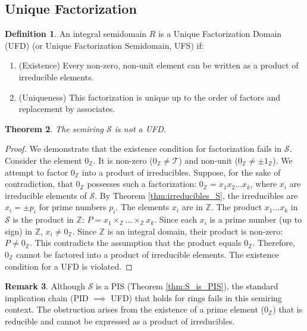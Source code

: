 \documentclass[11pt, a4paper]{article}
\theoremstyle{plain}
\newtheorem{theorem}{Theorem}[section]
\theoremstyle{definition}
\newtheorem{definition}[theorem]{Definition}
\newtheorem{remark}[theorem]{Remark}
\numberwithin{equation}{section}
\newcommand{\Z}{\mathbb{Z}}
\newcommand{\Tobj}{\mathcal{T}} %
\newcommand{\SemiringS}{\mathcal{S}}
\begin{document}
\subsection{Unique Factorization}

\begin{definition}
An integral semidomain $R$ is a Unique Factorization Domain (UFD) (or Unique Factorization Semidomain, UFS) if:
\begin{enumerate}
    \item (Existence) Every non-zero, non-unit element can be written as a product of irreducible elements.
    \item (Uniqueness) This factorization is unique up to the order of factors and replacement by associates.
\end{enumerate}
\end{definition}

\begin{theorem}\label{thm:S_not_UFD}
The semiring $\SemiringS$ is not a UFD.
\end{theorem}
\begin{proof}
We demonstrate that the existence condition for factorization fails in $\SemiringS$.
Consider the element $0_{\Z}$. It is non-zero ($0_{\Z}\neq\Tobj$) and non-unit ($0_{\Z}\neq\pm 1_{\Z}$).
We attempt to factor $0_{\Z}$ into a product of irreducibles. Suppose, for the sake of contradiction, that $0_{\Z}$ possesses such a factorization: $0_{\Z} = x_1 x_2 \dots x_k$, where $x_i$ are irreducible elements of $\SemiringS$.
By Theorem \ref{thm:irreducibles_S}, the irreducibles are $x_i = \pm p_i$ for prime numbers $p_i$.
The elements $x_i$ are in $\Z$. The product $x_1 \dots x_k$ in $\SemiringS$ is the product in $\Z$: $P = x_1\times_{\Z}\dots\times_{\Z} x_k$.
Since each $x_i$ is a prime number (up to sign) in $\Z$, $x_i \neq 0_{\Z}$. Since $\Z$ is an integral domain, their product is non-zero: $P \neq 0_{\Z}$.
This contradicts the assumption that the product equals $0_{\Z}$.
Therefore, $0_{\Z}$ cannot be factored into a product of irreducible elements. The existence condition for a UFD is violated.
\end{proof}

\begin{remark}
Although $\SemiringS$ is a PIS (Theorem \ref{thm:S_is_PIS}), the standard implication chain (PID $\implies$ UFD) that holds for rings fails in this semiring context. The obstruction arises from the existence of a prime element ($0_{\Z}$) that is reducible and cannot be expressed as a product of irreducibles.
\end{remark}
\end{document}
